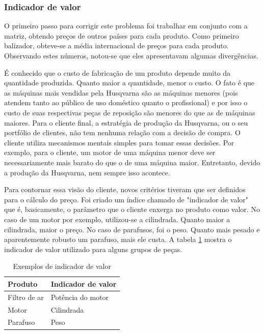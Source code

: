 \documentclass[12pt]{article}
\begin{document}
\subsubsection{Indicador de valor}

	O primeiro passo para corrigir este problema foi trabalhar em conjunto com a matriz, obtendo preços de outros países para cada produto. Como primeiro balizador, obteve-se a média internacional de preços para cada produto. Observando estes números, notou-se que eles apresentavam algumas divergências.

	É conhecido que o custo de fabricação de um produto depende muito da quantidade produzida. Quanto maior a quantidade, menor o custo. O fato é que as máquinas mais vendidas pela Husqvarna são as máquinas menores (pois atendem tanto ao público de uso doméstico quanto o profissional) e por isso o custo de suas respectivas peças de reposição são menores do que as de máquinas maiores. Para o cliente final, a estratégia de produção da Husqvarna, ou o seu portfólio de clientes, não tem nenhuma relação com a decisão de compra. O cliente utiliza mecanismos mentais simples para tomar essas decisões. Por exemplo, para o cliente, um motor de uma máquina menor deve ser necessariamente mais barato do que o de uma máquina maior. Entretanto, devido a produção da Husqvarna, nem sempre isso acontece.

	Para contornar essa visão do cliente, novos critérios tiveram que ser definidos para o cálculo do preço. Foi criado um índice chamado de "indicador de valor" que é, basicamente, o parâmetro que o cliente enxerga no produto como valor. No caso de um motor por exemplo, utilizou-se a cilindrada. Quanto maior a cilindrada, maior o preço. No caso de parafusos, foi o peso. Quanto mais pesado e aparentemente robusto um parafuso, mais ele custa. A tabela \ref{tab:valor} mostra o indicador de valor utilizado para alguns grupos de peças.

\begin{table}[!h]
	\centering
	\caption{Exemplos de indicador de valor}
	\begin{tabular}{| l | l |}
		\hline
		Produto & Indicador de valor \\ \hline
		Filtro de ar & Potência do motor \\
		Motor & Cilindrada \\
		Parafuso & Peso \\
		\hline
	\end{tabular}
	\label{tab:valor}
\end{table}
\end{document}
